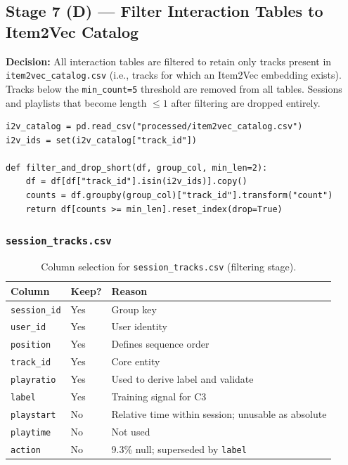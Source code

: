 \documentclass[11pt]{article}
\newcommand{\decision}[1]{\textcolor{decisionblue}{\textbf{Decision:} #1}}
\begin{document}
\subsection{Stage 7 (D) --- Filter Interaction Tables to Item2Vec Catalog}

\decision{All interaction tables are filtered to retain only tracks present
in \texttt{item2vec\_catalog.csv} (i.e., tracks for which an Item2Vec
embedding exists). Tracks below the \texttt{min\_count=5} threshold are
removed from all tables. Sessions and playlists that become length
$\le 1$ after filtering are dropped entirely.}

\begin{lstlisting}
i2v_catalog = pd.read_csv("processed/item2vec_catalog.csv")
i2v_ids = set(i2v_catalog["track_id"])

def filter_and_drop_short(df, group_col, min_len=2):
    df = df[df["track_id"].isin(i2v_ids)].copy()
    counts = df.groupby(group_col)["track_id"].transform("count")
    return df[counts >= min_len].reset_index(drop=True)
\end{lstlisting}

\subsubsection{\texttt{session\_tracks.csv}}

\begin{table}[H]
\centering
\caption{Column selection for \texttt{session\_tracks.csv} (filtering stage).}
\begin{tabular}{lll}
\toprule
\textbf{Column} & \textbf{Keep?} & \textbf{Reason} \\
\midrule
\texttt{session\_id} & Yes & Group key \\
\texttt{user\_id}    & Yes & User identity \\
\texttt{position}    & Yes & Defines sequence order \\
\texttt{track\_id}   & Yes & Core entity \\
\texttt{playratio}   & Yes & Used to derive label and validate \\
\texttt{label}       & Yes & Training signal for C3 \\
\texttt{playstart}   & No  & Relative time within session; unusable as absolute \\
\texttt{playtime}    & No  & Not used \\
\texttt{action}      & No  & 9.3\% null; superseded by \texttt{label} \\
\bottomrule
\end{tabular}
\end{table}
\end{document}
